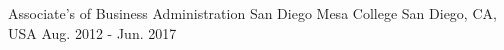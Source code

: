 

\begin{cventries}

	\cventry
	{Associate's of Business Administration} %
	{San Diego Mesa College} %
	{San Diego, CA, USA} %
	{Aug. 2012 - Jun. 2017} %
	{}

\end{cventries}
